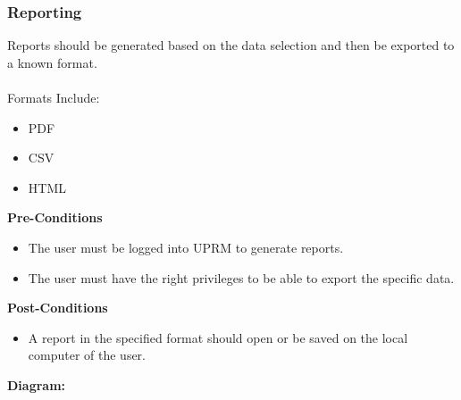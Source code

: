 \subsubsection{Reporting}
Reports should be generated based on the data selection and then be exported to a known format.\\ \\
Formats Include:
\begin{itemize}
	\item PDF
	\item CSV
	\item HTML
\end{itemize}
\textbf{Pre-Conditions}
\begin{itemize}
	\item The user must be logged into UPRM to generate reports.
	\item The user must have the right privileges to be able to export the specific data.
\end{itemize}
\textbf{Post-Conditions}
\begin{itemize}
	\item A report in the specified format should open or be saved on the local computer of the user.
\end{itemize}
\textbf{Diagram:}\\
\centerline{}